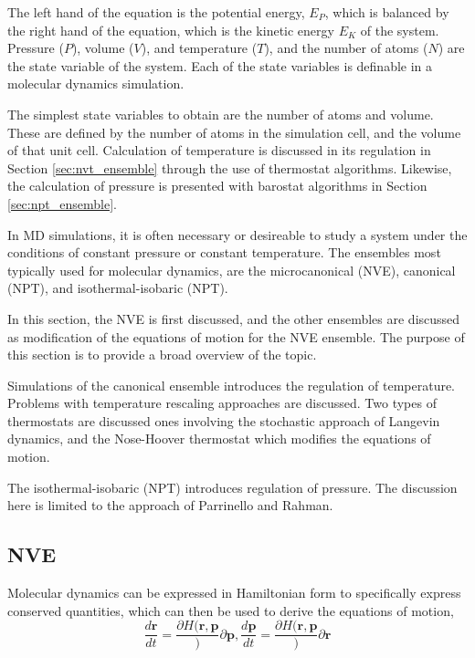   The left hand of the equation is the potential energy, $E_P$, which is balanced by the right hand of the equation, which is the kinetic energy $E_K$ of the system.  Pressure ($P$), volume ($V$), and temperature ($T$), and the number of atoms ($N$) are the state variable of the system.  Each of the state variables is definable in a molecular dynamics simulation.

  The simplest state variables to obtain are the number of atoms and volume.  These are defined by the number of atoms in the simulation cell, and the volume of that unit cell.  Calculation of temperature is discussed in its regulation in Section \ref{sec:nvt_ensemble} through the use of thermostat algorithms.  Likewise, the calculation of pressure is presented with barostat algorithms in Section \ref{sec:npt_ensemble}.

  In MD simulations, it is often necessary or desireable to study a system under the conditions of constant pressure or constant temperature.  The ensembles most typically used for molecular dynamics, are the microcanonical (NVE), canonical (NPT), and isothermal-isobaric (NPT).

  In this section, the NVE is first discussed, and the other ensembles are discussed as modification of the equations of motion for the NVE ensemble.  The purpose of this section is to provide a broad overview of the topic.

Simulations of the canonical ensemble introduces the regulation of temperature.  Problems with temperature rescaling approaches are discussed.  Two types of thermostats are discussed ones involving the stochastic approach of Langevin dynamics, and the Nose-Hoover thermostat\cite{hoover1985_npt} which modifies the equations of motion.

The isothermal-isobaric (NPT) introduces regulation of pressure.  The discussion here is limited to the approach of Parrinello and Rahman\cite{parrinello1981_barostat}.

\subsection{NVE}
Molecular dynamics can be expressed in Hamiltonian form to specifically express conserved quantities\cite{allen1987_md}, which can then be used to derive the equations of motion,
\begin{equation}
	\frac{d \bm{r}}{dt}=\frac{\partial H(\bm{r},\bm{p}}){\partial \bm{p}},
	\frac{d \bm{p}}{dt}=\frac{\partial H(\bm{r},\bm{p}}){\partial \bm{r}}
\end{equation}

